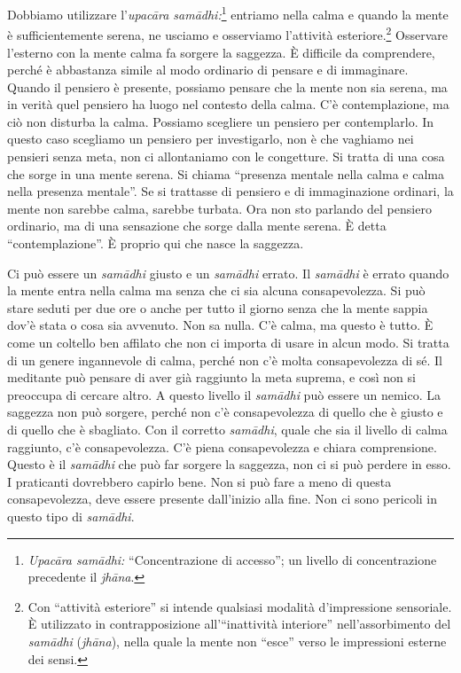 Dobbiamo utilizzare l'\emph{upacāra samādhi:}\footnote{\emph{Upacāra samādhi:}
  ``Concentrazione di accesso''; un livello di concentrazione precedente
  il \emph{jhāna}.} entriamo nella calma e quando la mente è
sufficientemente serena, ne usciamo e osserviamo l'attività
esteriore.\footnote{Con ``attività esteriore'' si intende qualsiasi
  modalità d'impressione sensoriale. È utilizzato in contrapposizione
  all'``inattività interiore'' nell'assorbimento del \emph{samādhi}
  (\emph{jhāna}), nella quale la mente non ``esce'' verso le impressioni
  esterne dei sensi.} Osservare l'esterno con la mente calma fa sorgere
la saggezza. È difficile da comprendere, perché è abbastanza simile al
modo ordinario di pensare e di immaginare. Quando il pensiero è
presente, possiamo pensare che la mente non sia serena, ma in verità
quel pensiero ha luogo nel contesto della calma. C'è contemplazione, ma
ciò non disturba la calma. Possiamo scegliere un pensiero per
contemplarlo. In questo caso scegliamo un pensiero per investigarlo, non
è che vaghiamo nei pensieri senza meta, non ci allontaniamo con le
congetture. Si tratta di una cosa che sorge in una mente serena. Si
chiama ``presenza mentale nella calma e calma nella presenza mentale''.
Se si trattasse di pensiero e di immaginazione ordinari, la mente non
sarebbe calma, sarebbe turbata. Ora non sto parlando del pensiero
ordinario, ma di una sensazione che sorge dalla mente serena. È detta
``contemplazione''. È proprio qui che nasce la saggezza.

Ci può essere un \emph{samādhi} giusto e un \emph{samādhi} errato. Il
\emph{samādhi} è errato quando la mente entra nella calma ma senza che
ci sia alcuna consapevolezza. Si può stare seduti per due ore o anche
per tutto il giorno senza che la mente sappia dov'è stata o cosa sia
avvenuto. Non sa nulla. C'è calma, ma questo è tutto. È come un coltello
ben affilato che non ci importa di usare in alcun modo. Si tratta di un
genere ingannevole di calma, perché non c'è molta consapevolezza di sé.
Il meditante può pensare di aver già raggiunto la meta suprema, e così
non si preoccupa di cercare altro. A questo livello il \emph{samādhi}
può essere un nemico. La saggezza non può sorgere, perché non c'è
consapevolezza di quello che è giusto e di quello che è sbagliato. Con
il corretto \emph{samādhi}, quale che sia il livello di calma raggiunto,
c'è consapevolezza. C'è piena consapevolezza e chiara comprensione.
Questo è il \emph{samādhi} che può far sorgere la saggezza, non ci si
può perdere in esso. I praticanti dovrebbero capirlo bene. Non si può
fare a meno di questa consapevolezza, deve essere presente dall'inizio
alla fine. Non ci sono pericoli in questo tipo di \emph{samādhi}.

